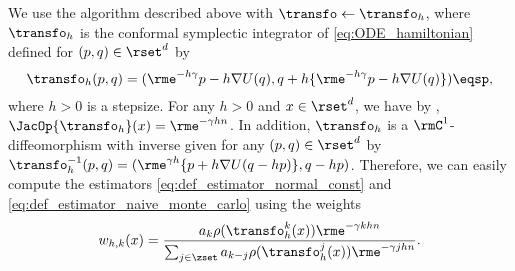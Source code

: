 We use the
algorithm described above with $\transfo\leftarrow\transfo_h$, where $\transfo_h$
is the conformal symplectic integrator of \eqref{eq:ODE_hamiltonian} defined for
$(p,q) \in \rset^{d}$ by
\begin{equation}
  \label{eq:def_psi_h}
\transfo_h(p,q) = (\rme^{-h \gamma } p -h \nabla U(q),q+h\{ \rme^{-h\gamma} p -h \nabla U(q)\}) \eqsp,
\end{equation}
where $h >0$ is a stepsize. For any $h >0$ and $x \in \rset^{d}$, we have
 by \cite[Theorem 2]{francca2019conformal},
$\JacOp{\transfo_h}(x) = \rme^{-\gamma h n}$. In addition, $\transfo_h$ is a $\rmC^1$-diffeomorphism with inverse given for any
$(p,q) \in \rset^{d}$ by $  \transfo_h^{-1}(p,q) = (\rme^{\gamma h}\{p+h \nabla
U(q-hp)\},q-hp)$.
Therefore, we can easily compute the estimators \eqref{eq:def_estimator_normal_const} and \eqref{eq:def_estimator_naive_monte_carlo} using the weights
\begin{equation} 
w_{h,k}(x) = \frac{ a_{k} \rho(\transfo^k_h(x)) \rme^{-\gamma k h n} }{
    \sum_{j \in\zset} a_{k-j} \rho(\transfo^j_h(x)) \rme^{-\gamma j h n} }.
\end{equation}

